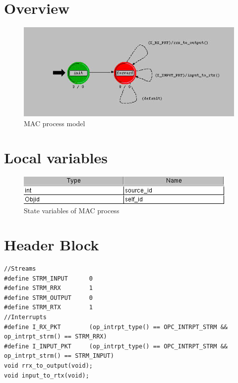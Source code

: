 
\section{Overview}
\begin{figure}[ht]
    \centering
    \includegraphics[width=.7\textwidth]{images/mac}
    \caption{MAC process model}
    \label{fig:appendix-d}
\end{figure}

\newpage

\section{Local variables}
\begin{figure}[ht]
    \centering
    \includegraphics[width=.7\textwidth]{images/state_variable_mac}
    \caption{State variables of MAC process}
    \label{fig:appendix-d_sv}
\end{figure}

\section{Header Block}
{\tiny
\begin{verbatim}
//Streams
#define STRM_INPUT		0
#define STRM_RRX		1
#define STRM_OUTPUT 	0
#define STRM_RTX		1
//Interrupts
#define I_RX_PKT		(op_intrpt_type() == OPC_INTRPT_STRM && op_intrpt_strm() == STRM_RRX)
#define I_INPUT_PKT		(op_intrpt_type() == OPC_INTRPT_STRM && op_intrpt_strm() == STRM_INPUT)
void rrx_to_output(void);
void input_to_rtx(void);

\end{verbatim}
}

